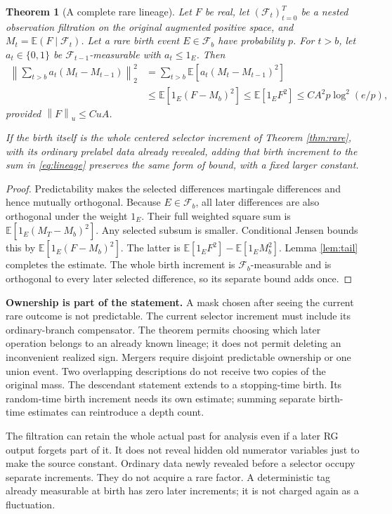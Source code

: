 \documentclass[11pt,letterpaper]{article}
\newtheorem{theorem}{Theorem}[section]
\theoremstyle{remark}\newtheorem{remark}[theorem]{Remark}
\newcommand{\E}{\mathbb E}
\newcommand{\norm}[1]{\left\lVert#1\right\rVert}
\newcommand{\cF}{\mathcal F}
\begin{document}
\begin{theorem}[A complete rare lineage]\label{thm:lineage}
Let \(F\) be real, let \((\cF_t)_{t=0}^T\) be a nested observation filtration on the original augmented positive space, and \(M_t=\E(F\mid\cF_t)\). Let a rare birth event \(E\in\cF_b\) have probability \(p\). For \(t>b\), let \(a_t\in\{0,1\}\) be \(\cF_{t-1}\)-measurable with \(a_t\le1_E\). Then
\begin{align}\label{eq:lineage}
 \norm{\sum_{t>b}a_t(M_t-M_{t-1})}_2^2
 &=\sum_{t>b}\E[a_t(M_t-M_{t-1})^2]\\
 &\le\E[1_E(F-M_b)^2]
 \le\E[1_EF^2]
 \le CA^2p\log^2(e/p),\nonumber
\end{align}
provided \(\norm{F}_u\le CuA\).

If the birth itself is the whole centered selector increment of Theorem \ref{thm:rare}, with its ordinary prelabel data already revealed, adding that birth increment to the sum in \eqref{eq:lineage} preserves the same form of bound, with a fixed larger constant.
\end{theorem}
\begin{proof}
Predictability makes the selected differences martingale differences and hence mutually orthogonal. Because \(E\in\cF_b\), all later differences are also orthogonal under the weight \(1_E\). Their full weighted square sum is
\(\E[1_E(M_T-M_b)^2]\). Any selected subsum is smaller. Conditional Jensen bounds this by
\(\E[1_E(F-M_b)^2]\). The latter is
\(\E[1_EF^2]-\E[1_EM_b^2]\).
Lemma \ref{lem:tail} completes the estimate. The whole birth increment is \(\cF_b\)-measurable and is orthogonal to every later selected difference, so its separate bound adds once.
\end{proof}

\textbf{Ownership is part of the statement.} A mask chosen after seeing the current rare outcome is not predictable. The current selector increment must include its ordinary-branch compensator. The theorem permits choosing which later operation belongs to an already known lineage; it does not permit deleting an inconvenient realized sign. Mergers require disjoint predictable ownership or one union event. Two overlapping descriptions do not receive two copies of the original mass. The descendant statement extends to a stopping-time birth. Its random-time birth increment needs its own estimate; summing separate birth-time estimates can reintroduce a depth count.

The filtration can retain the whole actual past for analysis even if a later RG output forgets part of it. It does not reveal hidden old numerator variables just to make the source constant. Ordinary data newly revealed before a selector occupy separate increments. They do not acquire a rare factor. A deterministic tag already measurable at birth has zero later increments; it is not charged again as a fluctuation.
\end{document}
